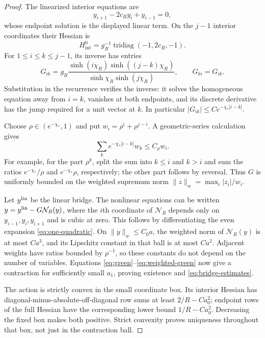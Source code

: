\begin{proof}
The linearized interior equations are
\[
 y_{i+1}-2c_Ry_i+y_{i-1}=0,
\]
whose endpoint solution is the displayed linear term. On the $j-1$
interior coordinates their Hessian is
\[
 H^0_{\mathrm{int}}=g_R^{-1}
       \operatorname{tridiag}(-1,2c_R,-1).
\]
For $1\le i\le k\le j-1$, its inverse has entries
\begin{equation}\label{eq:green}
 G_{ik}=g_R\frac{\sinh(i\chi_R)\sinh((j-k)\chi_R)}
                    {\sinh\chi_R\sinh(j\chi_R)},
 \qquad G_{ki}=G_{ik}.
\end{equation}
Substitution in the recurrence verifies the inverse: it solves the
homogeneous equation away from $i=k$, vanishes at both endpoints, and
its discrete derivative has the jump required for a unit vector at $k$.
In particular $|G_{ik}|\le C e^{-\chi_*|i-k|}$.

Choose $\rho\in(e^{-\chi_*},1)$ and put
$w_i=\rho^i+\rho^{j-i}$. A geometric-series calculation gives
\begin{equation}\label{eq:weighted-green}
 \sum_k e^{-\chi_*|i-k|}w_k\le C_\rho w_i.
\end{equation}
For example, for the part $\rho^k$, split the sum into $k\le i$ and
$k>i$ and sum the ratios $e^{-\chi_*}/\rho$ and
$e^{-\chi_*}\rho$, respectively; the other part follows by reversal.
Thus $G$ is uniformly bounded on the weighted supremum norm
$\|z\|_w=\max_i|z_i|/w_i$.

Let $y^{\rm lin}$ be the linear bridge. The nonlinear equations can be
written
$y=y^{\rm lin}-G\mathcal N_R(y)$, where the $i$th coordinate of
$\mathcal N_R$ depends only on $y_{i-1},y_i,y_{i+1}$ and is cubic at zero.
This follows by differentiating the even expansion
\eqref{eq:one-quadratic}. On $\|y\|_w\le C_0a$, the weighted norm of
$\mathcal N_R(y)$ is at most $C a^3$, and its Lipschitz constant in that
ball is at most $C a^2$. Adjacent weights have ratios bounded by
$\rho^{-1}$, so these constants do not depend on the number of variables.
Equations \eqref{eq:green}--\eqref{eq:weighted-green} now give a contraction
for sufficiently small $a_1$, proving existence and \eqref{eq:bridge-estimates}.

The action is strictly convex in the small coordinate box. Its interior
Hessian has diagonal-minus-absolute-off-diagonal row sums at least
$2/R-Ca_0^2$; endpoint rows of the full Hessian have the corresponding
lower bound $1/R-Ca_0^2$. Decreasing the fixed box makes both positive.
Strict convexity proves uniqueness throughout that box, not just in
the contraction ball.


\end{proof}

